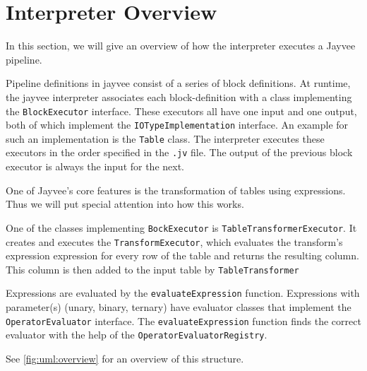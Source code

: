 \section{Interpreter Overview}
\label{section:prev}

In this section, we will give an overview of how the interpreter executes a Jayvee pipeline.

Pipeline definitions in jayvee consist of a series of block definitions.
At runtime, the jayvee interpreter associates each block-definition with a class implementing the \Verb|BlockExecutor| interface.
These executors all have one input and one output, both of which implement the \Verb|IOTypeImplementation| interface.
An example for such an implementation is the \Verb|Table| class.
The interpreter executes these executors in the order specified in the \Verb|.jv| file.
The output of the previous block executor is always the input for the next.

One of Jayvee's core features is the transformation of tables using expressions.
Thus we will put special attention into how this works.

One of the classes implementing \Verb|BockExecutor| is \Verb|TableTransformerExecutor|.
It creates and executes the \Verb|TransformExecutor|, which evaluates the transform's expression expression for every row of the table and returns the resulting column.
This column is then added to the input table by \Verb|TableTransformer|

Expressions are evaluated by the \Verb|evaluateExpression| function.
Expressions with parameter(s) (unary, binary, ternary) have evaluator classes that implement the \Verb|OperatorEvaluator| interface.
The \Verb|evaluateExpression| function finds the correct evaluator with the help of the \Verb|OperatorEvaluatorRegistry|.

See \ref{fig:uml:overview} for an overview of this structure.


